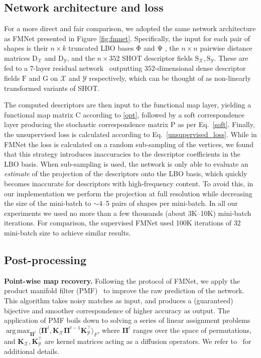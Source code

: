 \documentclass[10pt,twocolumn,letterpaper]{article}
\DeclareMathOperator*{\argmax}{arg\,max}
\newcommand{\bb}[1]{\bm{\mathrm{#1}}}
\begin{document}
\subsection{Network architecture and loss}
For a more direct and fair comparison, we adopted the same network architecture as FMNet presented in Figure \ref{fig:fmnet}. Specifically, the input for each pair of shapes is their $n\times k$ truncated LBO bases $\bb{\Phi}$ and $\bb{\Psi}$ , the $n\times n$ pairwise distance matrices $\bb{D}_\mathcal{X}$ and $\bb{D}_\mathcal{Y}$,
and the $n\times 352$ SHOT descriptor fields $\bb{S}_\mathcal{X},\bb{S}_\mathcal{Y}$. These are fed to a $7$-layer residual network~\cite{he2016deep} outputting $352$-dimensional dense descriptor fields $\bb{F}$ and $\bb{G}$ on $\mathcal{X}$ and $\mathcal{Y}$ respectively, which can be thought of as non-linearly transformed variants of SHOT.

The computed descriptors are then input to the functional map layer, yielding a functional map matrix $\bb{C}$ according to \eqref{opt}, followed by a soft correspondence layer producing the stochastic correspondence matrix $\bb{P}$ as per Eq.~\eqref{soft}. Finally, the unsupervised loss is calculated according to Eq.~\eqref{unsupervised_loss}.
While in FMNet the loss is calculated on a random sub-sampling of the vertices, we found that this strategy introduces inaccuracies to the descriptor coefficients in the LBO basis. When sub-sampling is used, the network is only able to evaluate an {\em estimate} of the projection of the descriptors onto the LBO basis, which quickly becomes inaccurate for descriptors with high-frequency content. To avoid this, in our implementation we perform the projection at full resolution while decreasing the size of the mini-batch to $\sim$4--5 pairs of shapes per mini-batch. In all our experiments we used no more than a few thousands (about 3K--10K) mini-batch iterations. For comparison, the supervised FMNet used 100K iterations of $32$ mini-batch size to achieve similar results.
\subsection{Post-processing}
\label{sec:postprocess}
\vspace{1ex}\noindent\textbf{Point-wise map recovery.}
Following the protocol of FMNet, we apply the product manifold filter (PMF)~\cite{vestner2017product} to improve the raw prediction of the network. This algorithm takes noisy matches as input, and produces a (guaranteed) bijective and smoother correspondence of higher accuracy as output. 
The application of PMF boils down to solving a series of linear assignment problems $\argmax_{\bm{\Pi}^t}\langle \bm{\Pi}^t, \mathbf{K}_\mathcal{X}\bm{\Pi}^{t-1}\mathbf{K}_\mathcal{Y}^\top \rangle_{F}$, where $\bm{\Pi}^t$ ranges over the space of permutations, and $\mathbf{K}_\mathcal{X},\mathbf{K}_\mathcal{Y}^\top$ are kernel matrices acting as a diffusion operators. We refer to~\cite{vestner2017product} for additional details.
\end{document}

